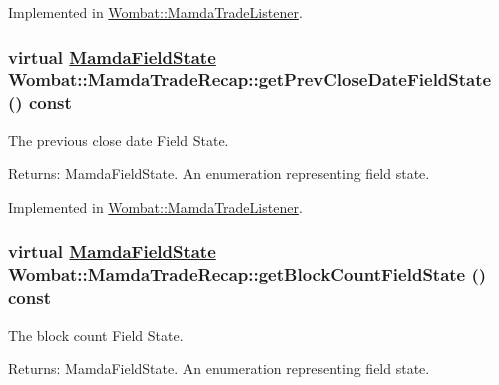 Implemented in \hyperlink{classWombat_1_1MamdaTradeListener_0df7a1c343774b3577b2e28867470ea9}{Wombat::Mamda\-Trade\-Listener}.\hypertarget{classWombat_1_1MamdaTradeRecap_33ca111d0e9e5b1bbe9e5c3ccd3d4c8c}{
\subsubsection[getPrevCloseDateFieldState]{\setlength{\rightskip}{0pt plus 5cm}virtual \hyperlink{namespaceWombat_93aac974f2ab713554fd12a1fa3b7d2a}{Mamda\-Field\-State} Wombat::Mamda\-Trade\-Recap::get\-Prev\-Close\-Date\-Field\-State () const}}
\label{classWombat_1_1MamdaTradeRecap_33ca111d0e9e5b1bbe9e5c3ccd3d4c8c}


The previous close date Field State. 

\begin{Desc}
\item[Returns:]Mamda\-Field\-State. An enumeration representing field state. \end{Desc}


Implemented in \hyperlink{classWombat_1_1MamdaTradeListener_280ff9e5c40998c03f12a789fe90613f}{Wombat::Mamda\-Trade\-Listener}.\hypertarget{classWombat_1_1MamdaTradeRecap_9b4768cd8bfe696c5a217d32926426f1}{
\subsubsection[getBlockCountFieldState]{\setlength{\rightskip}{0pt plus 5cm}virtual \hyperlink{namespaceWombat_93aac974f2ab713554fd12a1fa3b7d2a}{Mamda\-Field\-State} Wombat::Mamda\-Trade\-Recap::get\-Block\-Count\-Field\-State () const}}
\label{classWombat_1_1MamdaTradeRecap_9b4768cd8bfe696c5a217d32926426f1}


The block count Field State. 

\begin{Desc}
\item[Returns:]Mamda\-Field\-State. An enumeration representing field state. \end{Desc}


